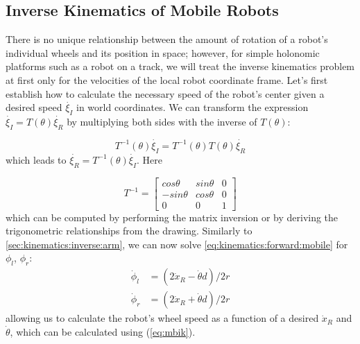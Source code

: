 \subsection{Inverse Kinematics of Mobile Robots}\label{sec:kinematics:inverse:mobile}

There is no unique relationship between the amount of rotation of a robot's individual wheels and its position in space; however, for simple holonomic platforms such as a robot on a track, we will treat the inverse kinematics problem at first only for the velocities of the local robot coordinate frame.
%
Let's first establish how to calculate the necessary speed of the robot's center given a desired speed $ \dot{\xi_I}$ in world coordinates. We can transform the expression $ \dot{\xi_I}=T(\theta)\dot{\xi_R}$ by multiplying both sides with the inverse of $ T(\theta)$:

\begin{equation}\label{eq:mbik}
T^{-1}(\theta)\dot{\xi_I}=T^{-1}(\theta)T(\theta)\dot{\xi_R}
\end{equation}
which leads to $ \dot{\xi_R}=T^{-1}(\theta)\dot{\xi_I}$. Here

\begin{equation}
T^{-1}=\left[\begin{array}{ccc}cos \theta & sin \theta & 0 \\ -sin \theta & cos \theta & 0 \\ 0 & 0 & 1\end{array}\right]
\end{equation}
which can be computed by performing the matrix inversion or by deriving the trigonometric relationships from the drawing.  Similarly to \cref{sec:kinematics:inverse:arm}, we can now solve \cref{eq:kinematics:forward:mobile}
for $ \phi_l$, $ \phi_r$:
\begin{eqnarray}
\dot{\phi}_l &= (2\dot{x}_R - \dot{\theta}d)/2r\\
\nonumber
\dot{\phi}_r &= (2\dot{x}_R + \dot{\theta}d)/2r
\end{eqnarray}
allowing us to calculate the robot's wheel speed as a function of a desired $\dot{x}_R$ and $\dot{\theta}$, which can be calculated using (\ref{eq:mbik}).

